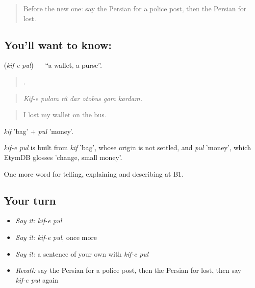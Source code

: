 \label{lesson:FA-C453-kif-e-pul}



\begin{quote}
Before the new one: say the Persian for a police post, then the Persian for lost.
\end{quote}

\subsection*{You'll want to know:  }
\textbf{ } (\emph{kif-e pul}) — \textquotedblleft{}a wallet, a purse\textquotedblright{}.

\begin{quote}
      .
\end{quote}

\begin{quote}
\emph{Kif-e pulam râ dar otobus gom kardam.}
\end{quote}

\begin{quote}
I lost my wallet on the bus.
\end{quote}

\emph{kif} 'bag' + \emph{pul} 'money'.

\begin{cousinweb}
\emph{kif-e pul} is built from \emph{kif} 'bag', whose origin is not settled, and \emph{pul} 'money', which EtymDB glosses 'change, small money'.
\end{cousinweb}

\begin{grammarlens}[title={What you've built}]
One more word for telling, explaining and describing at B1.
\end{grammarlens}

\subsection*{Your turn}
\begin{itemize}
\raggedright
  \item \emph{Say it:} \emph{kif-e pul}
  \item \emph{Say it:} \emph{kif-e pul}, once more
  \item \emph{Say it:} a sentence of your own with \emph{kif-e pul}
  \item \emph{Recall:} say the Persian for a police post, then the Persian for lost, then say \emph{kif-e pul} again
\end{itemize}

